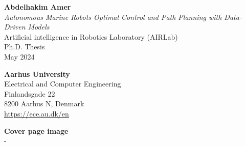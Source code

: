 \documentclass[
10pt, %
b5paper, %
twoside, %
openright  %
]{book}  %
\begin{document}
% 


\BgThispage  %
\vspace*{\fill}
\begin{minipage}{0.6\textwidth}
{}

\vspace*{\fill}
\textbf{Abdelhakim Amer } \\
\textit{Autonomous Marine Robots Optimal
Control and Path Planning with
Data-Driven Models } \\
Artificial intelligence in Robotics Laboratory (AIRLab) \\
Ph.D. Thesis \\
May 2024

\vspace*{2ex}
\textbf{Aarhus University} \\
Electrical and Computer Engineering \\
Finlandsgade 22 \\
8200 Aarhus N, Denmark \\
\url{https://ece.au.dk/en}

\vspace*{2ex}
\textbf{Cover page image} \\
- \\
\vspace*{2ex}
\end{minipage}
\hfill
\end{document}
